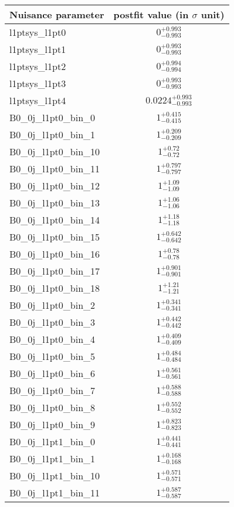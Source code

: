 
\begin{tabular}{|l|c|}
\hline
Nuisance parameter & postfit value (in $\sigma$ unit) \\\hline
l1ptsys\_l1pt0 & $0^{+0.993}_{-0.993}$ \\
l1ptsys\_l1pt1 & $0^{+0.993}_{-0.993}$ \\
l1ptsys\_l1pt2 & $0^{+0.994}_{-0.994}$ \\
l1ptsys\_l1pt3 & $0^{+0.993}_{-0.993}$ \\
l1ptsys\_l1pt4 & $0.0224^{+0.993}_{-0.993}$ \\
B0\_0j\_l1pt0\_bin\_0 & $1^{+0.415}_{-0.415}$ \\
B0\_0j\_l1pt0\_bin\_1 & $1^{+0.209}_{-0.209}$ \\
B0\_0j\_l1pt0\_bin\_10 & $1^{+0.72}_{-0.72}$ \\
B0\_0j\_l1pt0\_bin\_11 & $1^{+0.797}_{-0.797}$ \\
B0\_0j\_l1pt0\_bin\_12 & $1^{+1.09}_{-1.09}$ \\
B0\_0j\_l1pt0\_bin\_13 & $1^{+1.06}_{-1.06}$ \\
B0\_0j\_l1pt0\_bin\_14 & $1^{+1.18}_{-1.18}$ \\
B0\_0j\_l1pt0\_bin\_15 & $1^{+0.642}_{-0.642}$ \\
B0\_0j\_l1pt0\_bin\_16 & $1^{+0.78}_{-0.78}$ \\
B0\_0j\_l1pt0\_bin\_17 & $1^{+0.901}_{-0.901}$ \\
B0\_0j\_l1pt0\_bin\_18 & $1^{+1.21}_{-1.21}$ \\
B0\_0j\_l1pt0\_bin\_2 & $1^{+0.341}_{-0.341}$ \\
B0\_0j\_l1pt0\_bin\_3 & $1^{+0.442}_{-0.442}$ \\
B0\_0j\_l1pt0\_bin\_4 & $1^{+0.409}_{-0.409}$ \\
B0\_0j\_l1pt0\_bin\_5 & $1^{+0.484}_{-0.484}$ \\
B0\_0j\_l1pt0\_bin\_6 & $1^{+0.561}_{-0.561}$ \\
B0\_0j\_l1pt0\_bin\_7 & $1^{+0.588}_{-0.588}$ \\
B0\_0j\_l1pt0\_bin\_8 & $1^{+0.552}_{-0.552}$ \\
B0\_0j\_l1pt0\_bin\_9 & $1^{+0.823}_{-0.823}$ \\
B0\_0j\_l1pt1\_bin\_0 & $1^{+0.441}_{-0.441}$ \\
B0\_0j\_l1pt1\_bin\_1 & $1^{+0.168}_{-0.168}$ \\
B0\_0j\_l1pt1\_bin\_10 & $1^{+0.571}_{-0.571}$ \\
B0\_0j\_l1pt1\_bin\_11 & $1^{+0.587}_{-0.587}$ \\

\end{tabular}
